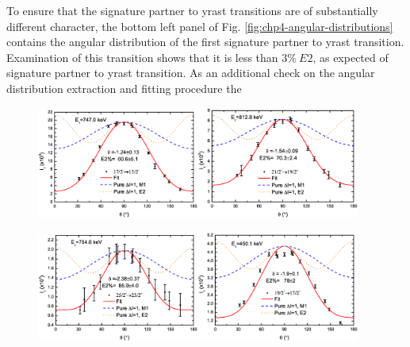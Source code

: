 To ensure that the signature partner to yrast transitions are of substantially different character, the bottom left panel of Fig. \ref{fig:chp4-angular-distributions} contains the angular distribution of the first signature partner to yrast transition. Examination of this transition shows that it is less than $3\%~E2$, as expected of signature partner to yrast transition. As an additional check on the angular distribution extraction and fitting procedure the
\begin{figure}[t!]
\centerline{\includegraphics[width=0.475\textwidth]{./img/c4/747Dist_Plot.eps}\hspace{0.04\textwidth}\includegraphics[width=0.475\textwidth]{./img/c4/813Dist_Plot.eps}}
\centerline{\includegraphics[width=0.475\textwidth]{./img/c4/755Dist_Plot.eps}\hspace{0.04\textwidth}\includegraphics[width=0.475\textwidth]{./img/c4/450Dist_Plot.eps}}

\end{figure}
